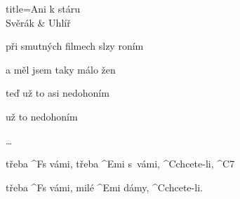 \begin{song}{title=\predtitle \centering Ani k stáru \\\large Svěrák \& Uhlíř   \vspace*{-0.3cm}}
\begin{centerjustified}
\begin{varwidth}[t]{0.48\textwidth}
    při smutných filmech slzy roním

    a měl jsem taky málo žen

    teď už to asi nedohoním

    už to nedohoním

\dots

	třeba ^{F}s vámi, třeba ^{Emi \z}s~vámi, ^{\z C}chcete-li, ^{C7}
    
	třeba ^{F}s vámi, milé ^{Emi \z}dámy, ^{\z C}chcete-li.

\end{varwidth}

\end{centerjustified}
\setcounter{Slokočet}{0}
\end{song}

